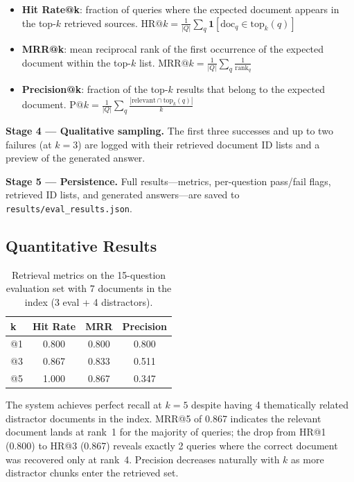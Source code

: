 \documentclass[10pt]{article}
\begin{document}
\begin{itemize}
  \item \textbf{Hit Rate@k}: fraction of queries where the expected document
        appears in the top-$k$ retrieved sources.
        $\text{HR}@k = \frac{1}{|Q|}\sum_{q} \mathbf{1}[\text{doc}_q \in
        \text{top}_k(q)]$
  \item \textbf{MRR@k}: mean reciprocal rank of the first occurrence of the
        expected document within the top-$k$ list.
        $\text{MRR}@k = \frac{1}{|Q|}\sum_{q} \frac{1}{\text{rank}_q}$
  \item \textbf{Precision@k}: fraction of the top-$k$ results that belong to
        the expected document.
        $\text{P}@k = \frac{1}{|Q|}\sum_{q} \frac{|\text{relevant} \cap
        \text{top}_k(q)|}{k}$
\end{itemize}

\textbf{Stage 4 — Qualitative sampling.}
The first three successes and up to two failures (at $k{=}3$) are logged with
their retrieved document ID lists and a preview of the generated answer.

\textbf{Stage 5 — Persistence.}
Full results---metrics, per-question pass/fail flags, retrieved ID lists,
and generated answers---are saved to \texttt{results/eval\_results.json}.

\subsection{Quantitative Results}

\begin{table}[h]
\centering
\caption{Retrieval metrics on the 15-question evaluation set
         with 7 documents in the index (3 eval + 4 distractors).}
\label{tab:metrics}
\small
\begin{tabular}{@{}lccc@{}}
\toprule
\textbf{k} & \textbf{Hit Rate} & \textbf{MRR} & \textbf{Precision} \\
\midrule
@1 & 0.800 & 0.800 & 0.800 \\
@3 & 0.867 & 0.833 & 0.511 \\
@5 & 1.000 & 0.867 & 0.347 \\
\bottomrule
\end{tabular}
\end{table}

The system achieves perfect recall at $k{=}5$ despite having 4 thematically
related distractor documents in the index.
MRR@5 of 0.867 indicates the relevant document lands at rank~1 for the
majority of queries; the drop from HR@1 (0.800) to HR@3 (0.867) reveals
exactly 2 queries where the correct document was recovered only at rank~4.
Precision decreases naturally with $k$ as more distractor chunks enter the
retrieved set.
\end{document}
